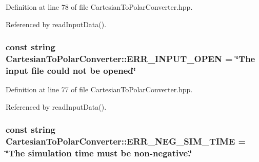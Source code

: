 \-Definition at line 78 of file \-Cartesian\-To\-Polar\-Converter.\-hpp.



\-Referenced by read\-Input\-Data().

\hypertarget{classmultiscale_1_1video_1_1CartesianToPolarConverter_a298f7aba7ec17e486484fa2e52ebc109}{
\subsubsection[{\-E\-R\-R\-\_\-\-I\-N\-P\-U\-T\-\_\-\-O\-P\-E\-N}]{\setlength{\rightskip}{0pt plus 5cm}const string {\bf \-Cartesian\-To\-Polar\-Converter\-::\-E\-R\-R\-\_\-\-I\-N\-P\-U\-T\-\_\-\-O\-P\-E\-N} = \char`\"{}\-The input file could not be opened\char`\"{}}}\label{classmultiscale_1_1video_1_1CartesianToPolarConverter_a298f7aba7ec17e486484fa2e52ebc109}


\-Definition at line 77 of file \-Cartesian\-To\-Polar\-Converter.\-hpp.



\-Referenced by read\-Input\-Data().

\hypertarget{classmultiscale_1_1video_1_1CartesianToPolarConverter_a0a3ab913d167193883dc96aed6cc8290}{
\subsubsection[{\-E\-R\-R\-\_\-\-N\-E\-G\-\_\-\-S\-I\-M\-\_\-\-T\-I\-M\-E}]{\setlength{\rightskip}{0pt plus 5cm}const string {\bf \-Cartesian\-To\-Polar\-Converter\-::\-E\-R\-R\-\_\-\-N\-E\-G\-\_\-\-S\-I\-M\-\_\-\-T\-I\-M\-E} = \char`\"{}\-The simulation time must be non-\/negative.\char`\"{}}}\label{classmultiscale_1_1video_1_1CartesianToPolarConverter_a0a3ab913d167193883dc96aed6cc8290}


